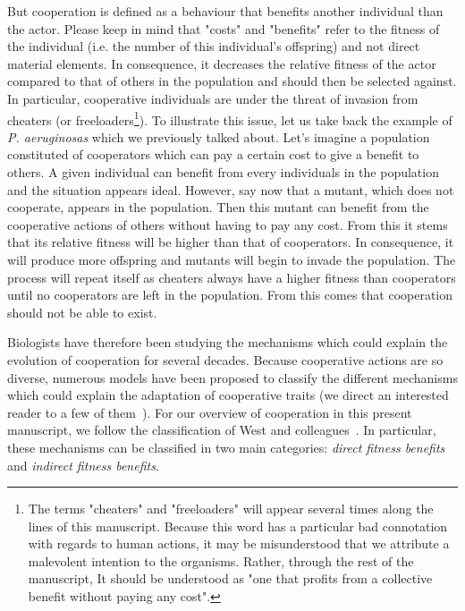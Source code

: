     But cooperation is defined as a behaviour that benefits another individual than the actor. Please keep in mind that "costs" and "benefits" refer to the fitness of the individual (i.e. the number of this individual's offspring) and not direct material elements. In consequence, it decreases the relative fitness of the actor compared to that of others in the population and should then be selected against. In particular, cooperative individuals are under the threat of invasion from cheaters (or freeloaders\footnote{The terms "cheaters" and "freeloaders" will appear several times along the lines of this manuscript. Because this word has a particular bad connotation with regards to human actions, it may be misunderstood that we attribute a malevolent intention to the organisms. Rather, through the rest of the manuscript, It should be understood as "one that profits from a collective benefit without paying any cost".}). To illustrate this issue, let us take back the example of \emph{P. aeruginosas} which we previously talked about. Let's imagine a population constituted of cooperators which can pay a certain cost to give a benefit to others. A given individual can benefit from every individuals in the population and the situation appears ideal. However, say now that a mutant, which does not cooperate, appears in the population. Then this mutant can benefit from the cooperative actions of others without having to pay any cost. From this it stems that its relative fitness will be higher than that of cooperators. In consequence, it will produce more offspring and mutants will begin to invade the population. The process will repeat itself as cheaters always have a higher fitness than cooperators until no cooperators are left in the population. From this comes that cooperation should not be able to exist. 

    Biologists have therefore been studying the mechanisms which could explain the evolution of cooperation for several decades. Because cooperative actions are so diverse, numerous models have been proposed to classify the different mechanisms which could explain the adaptation of cooperative traits (we direct an interested reader to a few of them~\parencite{Dugatkin2002, Keller2006, Bergmuller2007a, West2007}). For our overview of cooperation in this present manuscript, we follow the classification of West and colleagues~\parencite{West2007a}. In particular, these mechanisms can be classified in two main categories: \emph{direct fitness benefits} and \emph{indirect fitness benefits}.

